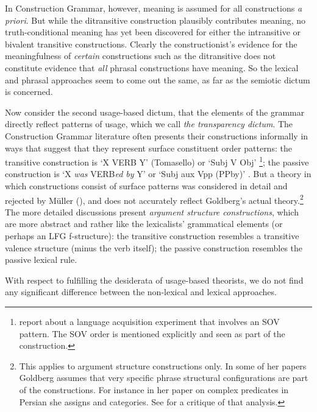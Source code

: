 In Construction Grammar, however, meaning is assumed for all constructions  \emph{a priori}.  But
while the ditransitive construction plausibly contributes meaning, no truth-conditional meaning has
yet been discovered for either the intransitive or bivalent transitive constructions.  Clearly the
constructionist's evidence for the meaningfulness of \emph{certain} constructions such as the
ditransitive does not constitute evidence that \emph{all} phrasal constructions have meaning.  So
the lexical and phrasal approaches seem to come out the same, as far as the semiotic dictum is
concerned.


Now consider the second usage-based dictum, that the elements of the grammar directly reflect
patterns of usage, which we call \emph{the transparency dictum}.  The Construction Grammar
literature often presents their constructions informally in ways that suggest that they represent
surface constituent order patterns: the transitive construction is `X VERB Y' (Tomasello) or `Subj V Obj'
\citep{Goldberg95a,Goldberg2006a}\footnote{
  \citet[]{GCS2004a} report about a language acquisition experiment that involves an SOV
  pattern. The SOV order is mentioned explicitly and seen as part of the construction.
}; the passive construction is `X \emph{was} VERB\emph{ed by} Y'
\citep[]{Tomasello2003a} or `Subj aux Vpp (PPby)' \citep[]{Goldberg2006a}.  But a theory
in which constructions consist of surface patterns was considered in detail and rejected by
Müller (\citeyear[Section~2]{Mueller2006d}), and does not accurately reflect Goldberg's actual
theory.\footnote{
  This applies to argument structure constructions only. In some of her papers Goldberg assumes that
  very specific phrase structural configurations are part of the constructions. For instance in her
  paper on complex predicates in Persian \citep{Goldberg2003a} she assigns \vnull and \vbar categories. See
   for a critique of that analysis.} 
The more detailed discussions present \emph{argument structure
  constructions}, which are more abstract and rather like the lexicalists' grammatical elements (or
perhaps an LFG f-structure): the transitive construction resembles a transitive valence structure
(minus the verb itself); the passive construction resembles the passive lexical rule.

With respect to fulfilling the desiderata of usage-based theorists, we do not find 
any significant difference between the
non-lexical and lexical approaches.  
  
